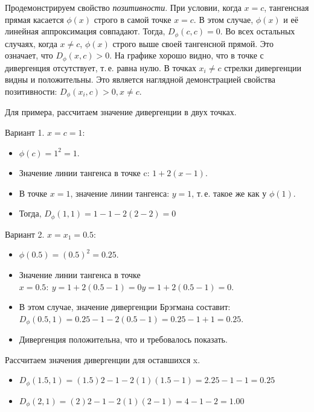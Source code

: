 \documentclass[12pt]{scrartcl}
\begin{document}
Продемонстрируем свойство \emph{позитивности}. При условии, когда $x = c$, тангенсная прямая касается $\phi(x)$ строго в самой точке $x = c$. В этом случае, $\phi(x)$ и её линейная аппроксимация совпадают. Тогда, $D_{\phi}(c, c) = 0$. Во всех остальных случаях, когда $x \neq c$, $\phi(x)$ строго выше своей тангенсной прямой. Это означает, что $D_{\phi}(x,c) > 0$. На графике хорошо видно, что в точке с дивергенция отсутствует, т.\,е. равна нулю. В точках $x_{i} \neq c$ стрелки дивергенции видны и положительны. Это является наглядной демонстрацией свойства позитивности: $D_\phi(x_{i},c) > 0, x \neq c$.

Для примера, рассчитаем значение дивергенции в двух точках.

Вариант 1. $x = c = 1$:
\begin{itemize}
    \item $\phi(c) = 1^{2} = 1$.
    \item Значение линии тангенса в точке c: $1 + 2(x-1)$.
    \item В точке $x = 1$, значение линии тангенса: $y = 1$, т.\,е. такое же как у $\phi(1)$.
    \item Тогда, $D_\phi(1,1) = 1 - 1 -2(2 - 2) = 0$
\end{itemize}

Вариант 2. $x = x_{1} = 0.5$:
\begin{itemize}
    \item $\phi(0.5) = (0.5)^{2} = 0.25$.
    \item Значение линии тангенса в точке $x=0.5:\ y = 1 + 2(0.5 − 1) = 0y = 1 + 2(0.5 − 1) = 0$.
    \item В этом случае, значение дивергенции Брэгмана составит: $D_\phi​(0.5, 1) = 0.25 − 1 − 2(0.5 − 1) = 0.25 − 1 + 1 = 0.25$.
    \item Дивергенция положительна, что и требовалось показать.
\end{itemize}
Рассчитаем значения дивергенции для оставшихся x.
\begin{itemize}
    \item $D_\phi​(1.5, 1) = (1.5)2 − 1 − 2(1)(1.5 − 1) = 2.25 − 1 − 1 = 0.25$
    \item $D_\phi(2, 1 ) = (2)2 − 1 − 2(1)(2 − 1) = 4 − 1 − 2 = 1.00$
\end{itemize}
\end{document}
